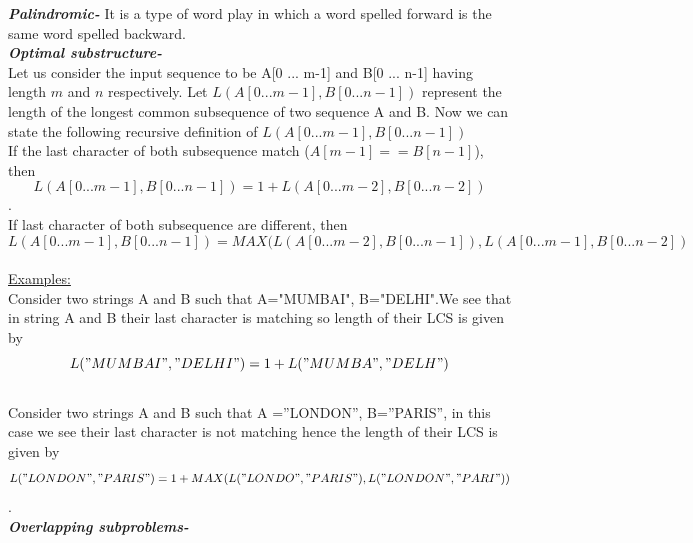 \documentclass[12pt]{book}
\begin{document}
\textbf{\textit{Palindromic-}} 
                 It is a type of word play in which a word spelled forward is the same word spelled backward.\\

\textbf{\textit{Optimal substructure-}} \\
Let us consider the input sequence to be A[0 ... m-1] and B[0 ... n-1] having length $m$ and $n$ respectively. Let $L(A[0 ... m-1], B[0 ... n-1])$ represent the length of the longest common subsequence of two sequence A and B. Now we can state the following recursive definition of $L(A[0 ... m-1], B[0 ... n-1])$ \\
If the last character of both subsequence match ($A[m-1] == B[n-1]$), then\\
\[L(A[0 ... m-1], B[0 ... n-1]) = 1 + L(A[0 ... m-2], B[0 ... n-2])\].\\

If last character of both subsequence are different, then\\
\[L(A[0 ... m-1], B[0 ... n-1]) = MAX(L(A[0 ... m-2], B[0 ... n-1]), L(A[0 ... m-1], B[0 ... n-2])\] \\

\underline{Examples:}\\
Consider two strings A and B such that  A="MUMBAI", B="DELHI".We see that in string A and B their last character is matching so length of their LCS is given by\\
\[L("MUMBAI", "DELHI") = 1 + L("MUMBA", "DELH")\]\\

Consider two strings A and B such that A =”LONDON”, B=”PARIS”, in this case we see their last character is not matching hence the length of their LCS is given by\\
\[L("LONDON", "PARIS") = 1 + MAX(L("LONDO", "PARIS"), L("LONDON", "PARI"))\].\\

\textbf{\textit{Overlapping subproblems-}}\\
\end{document}
